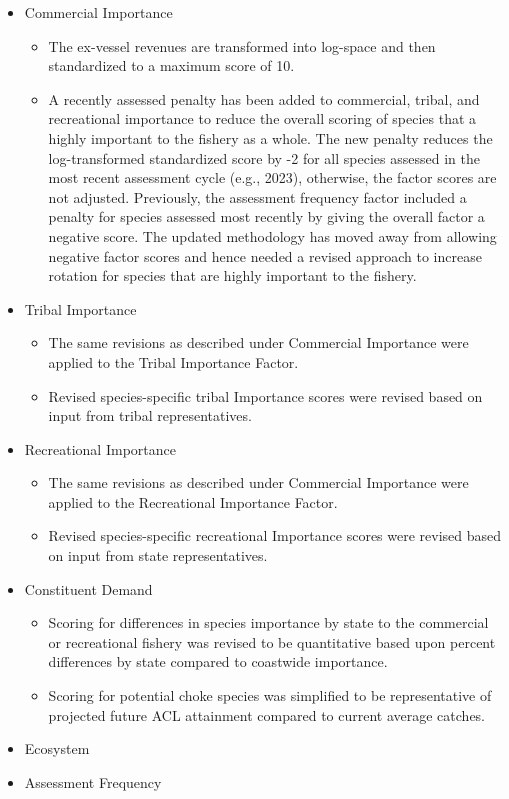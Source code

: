 \documentclass[11pt,
  english,
  a4paper,
]{article}
\providecommand{\tightlist}{%
  \setlength{\itemsep}{0pt}\setlength{\parskip}{0pt}}
\providecommand{\tightlist}{%
  \setlength{\itemsep}{0pt}\setlength{\parskip}{0pt}}
\begin{document}
\begin{itemize}
\item
  Commercial Importance

  \begin{itemize}
  \tightlist
  \item
    The ex-vessel revenues are transformed into log-space and then standardized to a maximum score of 10.
  \item
    A recently assessed penalty has been added to commercial, tribal, and recreational importance to reduce the overall scoring of species that a highly important to the fishery as a whole. The new penalty reduces the log-transformed standardized score by -2 for all species assessed in the most recent assessment cycle (e.g., 2023), otherwise, the factor scores are not adjusted. Previously, the assessment frequency factor included a penalty for species assessed most recently by giving the overall factor a negative score. The updated methodology has moved away from allowing negative factor scores and hence needed a revised approach to increase rotation for species that are highly important to the fishery.
  \end{itemize}
\item
  Tribal Importance

  \begin{itemize}
  \tightlist
  \item
    The same revisions as described under Commercial Importance were applied to the Tribal Importance Factor.
  \item
    Revised species-specific tribal Importance scores were revised based on input from tribal representatives.
  \end{itemize}
\item
  Recreational Importance

  \begin{itemize}
  \tightlist
  \item
    The same revisions as described under Commercial Importance were applied to the Recreational Importance Factor.
  \item
    Revised species-specific recreational Importance scores were revised based on input from state representatives.
  \end{itemize}
\item
  Constituent Demand

  \begin{itemize}
  \tightlist
  \item
    Scoring for differences in species importance by state to the commercial or recreational fishery was revised to be quantitative based upon percent differences by state compared to coastwide importance.
  \item
    Scoring for potential choke species was simplified to be representative of projected future ACL attainment compared to current average catches.
  \end{itemize}
\item
  Ecosystem
\item
  Assessment Frequency


\end{itemize}
\end{document}
